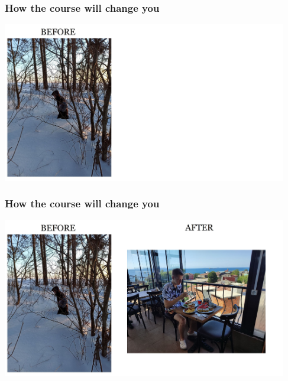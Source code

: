 \documentclass[aspectratio=1610,t]{beamer}
\begin{document}
\begin{frame}[c]
\frametitle{How the course will change you}

\begin{center}
\includegraphics[width=\textwidth,height=7cm,keepaspectratio]{images/me_before.jpg}
\end{center}

\end{frame}


\begin{frame}[c]
\frametitle{How the course will change you}
\begin{center}
\includegraphics[width=\textwidth,height=7cm,keepaspectratio]{images/me_after.jpg}
\end{center}

\end{frame}

\end{document}
